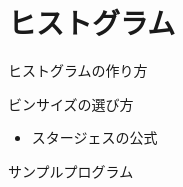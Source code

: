 \section{ヒストグラム}

\begin{frame}[t,fragile]{ヒストグラムの作り方}
\end{frame}

\begin{frame}[t,fragile]{ビンサイズの選び方}
  \begin{itemize}
    \item スタージェスの公式
  \end{itemize}
\end{frame}

\begin{frame}[t,fragile]{サンプルプログラム}
\end{frame}
